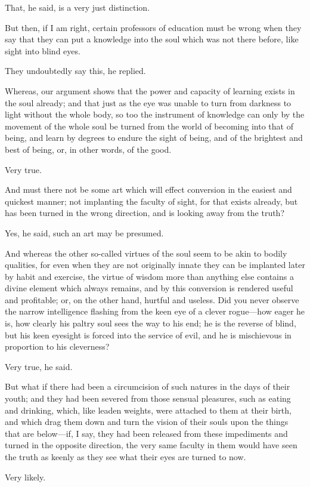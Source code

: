 That, he said, is a very just distinction.

But then, if I am right, certain professors of education must be wrong
when they say that they can put a knowledge into the soul which was
not there before, like sight into blind eyes.

They undoubtedly say this, he replied.

Whereas, our argument shows that the power and capacity of learning
exists in the soul already; and that just as the eye was unable to
turn from darkness to light without the whole body, so too the
instrument of knowledge can only by the movement of the whole soul be
turned from the world of becoming into that of being, and learn by
degrees to endure the sight of being, and of the brightest and best of
being, or, in other words, of the good.

Very true.

And must there not be some art which will effect conversion in the
easiest and quickest manner; not implanting the faculty of sight, for
that exists already, but has been turned in the wrong direction, and
is looking away from the truth?

Yes, he said, such an art may be presumed.

And whereas the other so-called virtues of the soul seem to be akin to
bodily qualities, for even when they are not originally innate they
can be implanted later by habit and exercise, the virtue of wisdom
more than anything else contains a divine element which always
remains, and by this conversion is rendered useful and profitable; or,
on the other hand, hurtful and useless. Did you never observe the
narrow intelligence flashing from the keen eye of a clever rogue---how
eager he is, how clearly his paltry soul sees the way to his end; he
is the reverse of blind, but his keen eyesight is forced into the
service of evil, and he is mischievous in proportion to his
cleverness?

Very true, he said.

But what if there had been a circumcision of such natures in the days
of their youth; and they had been severed from those sensual
pleasures, such as eating and drinking, which, like leaden weights,
were attached to them at their birth, and which drag them down and
turn the vision of their souls upon the things that are be\-low---if,
I say, they had been released from these impediments and turned in the
opposite direction, the very same faculty in them would have seen the
truth as keenly as they see what their eyes are turned to now.

Very likely.

